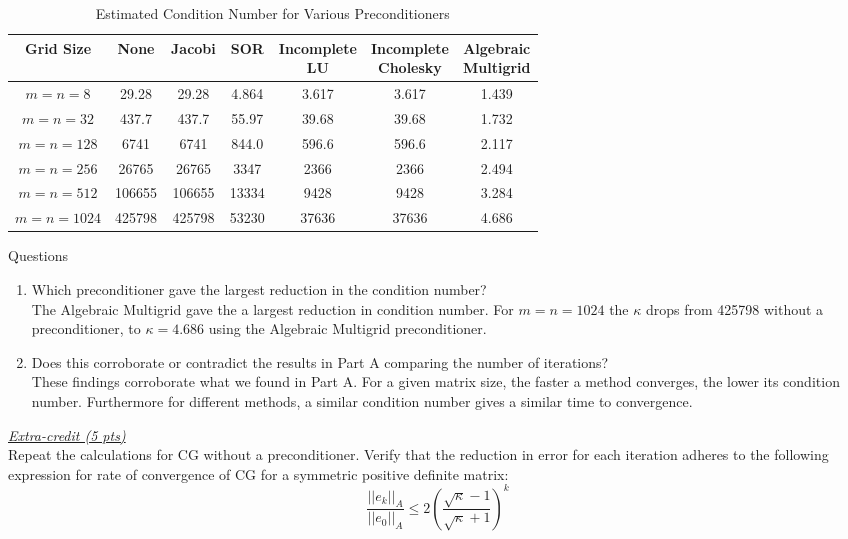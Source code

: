 \documentclass[letterpaper]{article}
\begin{document}
\begin{table}[h!]
    \centering
    \caption{Estimated Condition Number for Various Preconditioners}
    \begin{tabular}{|c|c|c|c|c|c|c|}
    \hline
     Grid Size & None & Jacobi & SOR & \thead{Incomplete\\ LU} & \thead{Incomplete\\ Cholesky} & \thead{Algebraic\\ Multigrid} \\\hline
     $m=n=8$     & 29.28  & 29.28  & 4.864 & 3.617 & 3.617 & 1.439 \\\hline
     $m=n=32$    & 437.7  & 437.7  & 55.97 & 39.68 & 39.68 & 1.732 \\\hline
     $m=n=128$   & 6741   & 6741   & 844.0 & 596.6 & 596.6 & 2.117 \\\hline
     $m=n=256$   & 26765  & 26765  & 3347  & 2366  & 2366  & 2.494 \\\hline
     $m=n=512$   & 106655 & 106655 & 13334 & 9428  & 9428  & 3.284 \\\hline
     $m=n=1024$  & 425798 & 425798 & 53230 & 37636 & 37636 & 4.686 \\\hline
    \end{tabular}
\end{table}


Questions
\begin{enumerate}
    \item Which preconditioner gave the largest reduction in the condition number? \\

    The Algebraic Multigrid gave the a largest reduction in condition number. For $m = n = 1024$ the $\kappa$ drops from 425798 without a preconditioner, to $\kappa = 4.686$ using the Algebraic Multigrid preconditioner.
    
    \item Does this corroborate or contradict the results in Part A comparing the number of iterations? \\

    These findings corroborate what we found in Part A. For a given matrix size, the faster a method converges, the lower its condition number. Furthermore for different methods, a similar condition number gives a similar time to convergence.
\end{enumerate}

\underline{\textit{Extra-credit (5 pts)}}\\
Repeat the calculations for CG without a preconditioner.
Verify that the reduction in error for each iteration adheres to the following expression for rate of convergence of CG for a symmetric positive definite matrix:
\begin{equation*}
    \frac{||e_k||_A}{||e_0||_A} \leq 2 \left( \frac{\sqrt{\kappa}-1}{\sqrt{\kappa}+1} \right)^k
\end{equation*}
\end{document}
